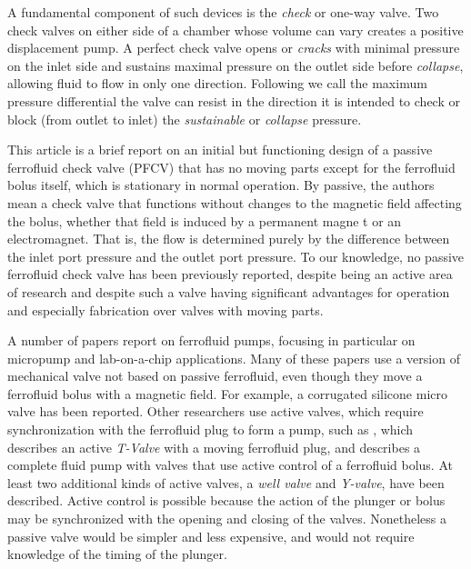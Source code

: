 \documentclass{asme2ej}
\begin{document}
A fundamental component of such
devices is the {\em check} or one-way valve.
Two check
valves on either side of a chamber whose volume can vary creates a
positive displacement pump.
A perfect check valve opens or
{\em cracks} with minimal pressure on the inlet side and sustains maximal
pressure on the outlet side before {\em collapse},
allowing fluid to flow in only one
direction. Following\cite{hartshorne2004ferrofluid} we call the maximum pressure
differential the valve can resist in the direction it is intended to
check or block (from outlet to inlet) the {\em sustainable} or {\em collapse} pressure.

This article is a brief report on an initial but functioning design of a
passive ferrofluid check valve (PFCV) that has no moving
parts except for the ferrofluid bolus itself, which is stationary
in normal operation.
By passive, the authors
mean a check valve that functions without changes to the magnetic
field affecting the bolus, whether that field is induced by a
permanent magne t or an electromagnet.
That is, the flow is determined
purely by the difference between the inlet port pressure and the
outlet port pressure.
To our knowledge, no passive
ferrofluid check valve has been previously reported, despite being an
active area of research and despite such a valve having
significant advantages for operation and especially
fabrication over valves with moving parts.


A number of papers report on ferrofluid pumps, focusing in particular
on micropump and lab-on-a-chip applications\cite{ozbey2015modeling,hsu2018biocompatible}.
Many of these papers use
a version of mechanical valve not based on passive
ferrofluid, even though they move a ferrofluid bolus
with a magnetic field.
For example,
a corrugated silicone micro valve\cite{yamahata2003ferrofluid,yamahata2005plastic}
has been reported.
Other researchers use active valves, which require synchronization with
the ferrofluid plug to form a pump,
such as \cite{menz2000fluidic}, which
describes an active {\em T-Valve} with a moving ferrofluid plug, and
\cite{ando2009ferrofluidic} describes a complete fluid pump with valves
that use
active control of a ferrofluid bolus.
At least two additional kinds of active valves, a {\em well valve} and
{\em Y-valve}, have
been described\cite{hartshorne2004ferrofluid}.
Active control is possible because the
action of the plunger or bolus may be synchronized with the opening and closing
of the valves.
Nonetheless a passive valve would be simpler and less
expensive, and would not require knowledge of the timing of the
plunger.
\end{document}
